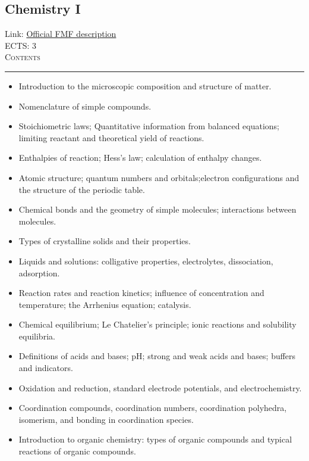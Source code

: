 \documentclass[11pt, a4paper]{article}
\newenvironment{course}[3]{
\subsection{#1}%
Link: \href{#2}{Official FMF description}\\%
ECTS: #3%
\vspace{1ex}
\\
{\large \textsc{Contents}}\\[-0.9ex]%
\rule{\textwidth}{0.5pt}
\vspace{-3ex}
}
{}
\newenvironment{chapter}[1]{
\begin{tcolorbox}[title=#1, breakable]
}
{\end{tcolorbox}}
\begin{document}
\begin{course}{Chemistry I}{https://www.fmf.uni-lj.si/en/study-physics/programmes/1fiz/2020/7000777/courses/1152/}{3}
    \label{chemistry_1}

    \begin{chapter}{Material}
        \begin{itemize}
            
            \item Introduction to the microscopic composition and structure of matter.

            \item Nomenclature of simple compounds.

            \item Stoichiometric laws; Quantitative information from balanced equations; limiting reactant and theoretical yield of reactions.

            \item Enthalpies of reaction; Hess's law; calculation of enthalpy changes.

            \item Atomic structure; quantum numbers and orbitals;electron configurations and the structure of the periodic table.

            \item Chemical bonds and the geometry of simple molecules; interactions between molecules.

            \item Types of crystalline solids and their properties.

            \item Liquids and solutions: colligative properties, electrolytes, dissociation, adsorption.

            \item Reaction rates and reaction kinetics; influence of concentration and temperature; the Arrhenius equation; catalysis.

            \item Chemical equilibrium; Le Chatelier's principle; ionic reactions and solubility equilibria.

            \item Definitions of acids and bases; pH; strong and weak acids and bases; buffers and indicators.

            \item Oxidation and reduction, standard electrode potentials, and electrochemistry.

            \item Coordination compounds, coordination numbers, coordination polyhedra, isomerism, and bonding in coordination species.

            \item Introduction to organic chemistry: types of organic compounds and typical reactions of organic compounds.
            
        \end{itemize}
    \end{chapter}

\end{course}
\end{document}
